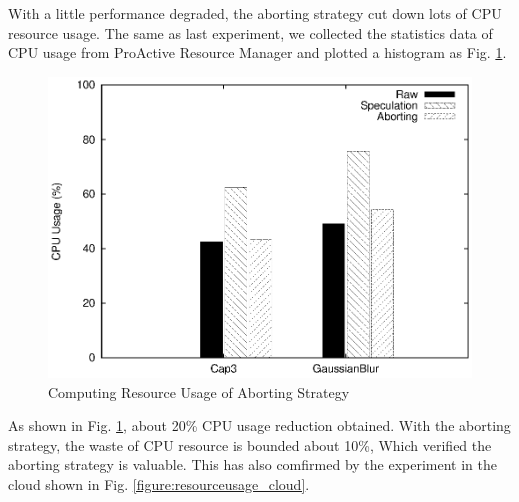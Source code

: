 With a little performance degraded, the aborting strategy cut down lots of CPU resource usage. The same as last experiment, we collected the statistics data of CPU usage from ProActive Resource Manager and plotted a histogram as Fig. \ref{figure:abort_resourceusage}.

\begin{figure}
\centering
\includegraphics[width=0.9\columnwidth]{figures/abort_resource_usage.eps}
\caption{Computing Resource Usage of Aborting Strategy}
\label{figure:abort_resourceusage}
\end{figure}

As shown in Fig. \ref{figure:abort_resourceusage}, about 20\% CPU usage reduction obtained. With the aborting strategy, the waste of CPU resource is bounded about 10\%, Which verified the aborting strategy is valuable. This has also comfirmed by the experiment in the cloud shown in Fig. \ref{figure:resourceusage_cloud}. 
